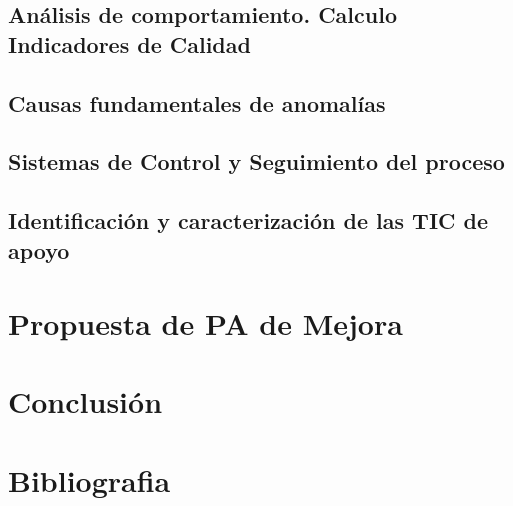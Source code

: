 	\subsection{Análisis de comportamiento. Calculo Indicadores de Calidad}
	\subsection{Causas fundamentales de anomalías}
	\subsection{Sistemas de Control y Seguimiento del proceso}
	\subsection{Identificación y caracterización de las TIC de apoyo}
\section{Propuesta de PA de Mejora}
\section{Conclusión}
\section{Bibliografia}

	


